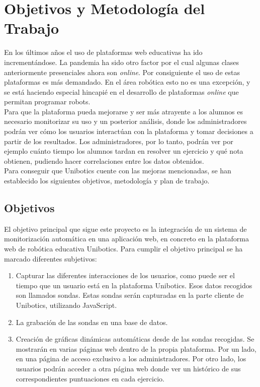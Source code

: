 \chapter{Objetivos y Metodología del Trabajo}\label{objetivos}

En los últimos años el uso de plataformas web educativas ha ido incrementándose. La pandemia ha sido otro factor por el cual algunas clases anteriormente presenciales ahora son \textit{online}. Por consiguiente el uso de estas plataformas es más demandado. En el área robótica esto no es una excepción, y se está haciendo especial hincapié en el desarrollo de plataformas \textit{online} que permitan programar robots.\\

Para que la plataforma pueda mejorarse y ser más atrayente a los alumnos es necesario monitorizar su uso y un posterior análisis, donde los administradores podrán ver cómo los usuarios interactúan con la plataforma y tomar decisiones a partir de los resultados. Los administradores, por lo tanto, podrán ver por ejemplo cuánto tiempo los alumnos tardan en resolver un ejercicio y qué nota obtienen, pudiendo hacer correlaciones entre los datos obtenidos.\\

Para conseguir que Unibotics cuente con las mejoras mencionadas, se han establecido los siguientes objetivos, metodología y plan de trabajo.
\newpage

\section{Objetivos}

El objetivo principal que sigue este proyecto es la integración de un sistema de monitorización automática en una aplicación web,
en concreto en la plataforma web de robótica educativa
Unibotics. Para cumplir el objetivo principal se ha marcado diferentes subjetivos:

\begin{enumerate}
\item Capturar las diferentes interacciones de los usuarios, como puede ser el tiempo que un usuario está en la plataforma Unibotics. Esos datos recogidos son llamados sondas. Estas sondas serán capturadas en la parte cliente de Unibotics, utilizando JavaScript.
\item La grabación de las sondas en una base de datos.
\item Creación de gráficas dinámicas automáticas desde de las sondas recogidas. Se mostrarán en varias páginas web dentro de la propia plataforma. Por un lado, en una página de acceso exclusivo a los administradores. Por otro lado, los usuarios podrán acceder a otra página web donde ver un histórico de sus correspondientes puntuaciones en cada ejercicio.
\end{enumerate}

